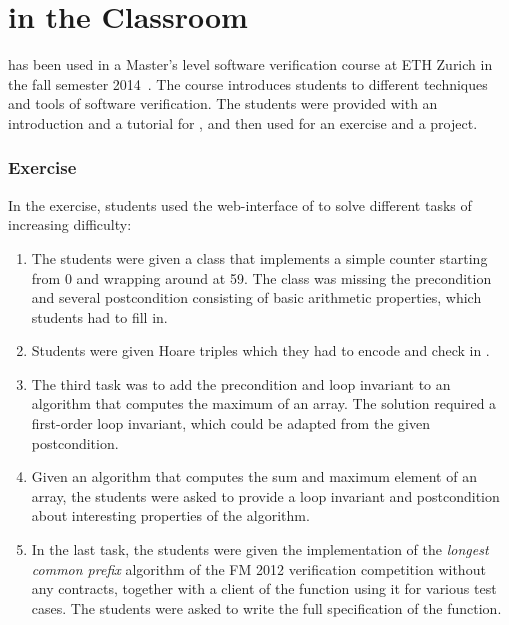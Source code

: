 \section{\AutoProof in the Classroom}
\label{sec:eval-teaching}

\AutoProof has been used in a Master's level software verification course at ETH Zurich in the fall semester 2014~\cite{SVCOURSE14}.
The course introduces students to different techniques and tools of software verification.
The students were provided with an introduction and a tutorial for \AutoProof, and then used \AutoProof for an exercise and a project.

\subsubsection{Exercise}

In the exercise, students used the web-interface of \AutoProof to solve different tasks of increasing difficulty:

\begin{enumerate}

\item The students were given a class that implements a simple counter starting from 0 and wrapping around at 59. The class was missing the precondition and several postcondition consisting of basic arithmetic properties, which students had to fill in.

\item Students were given Hoare triples which they had to encode and check in \AutoProof.

\item The third task was to add the precondition and loop invariant to an algorithm that computes the maximum of an array. The solution required a first-order loop invariant, which could be adapted from the given postcondition.

\item Given an algorithm that computes the sum and maximum element of an array, the students were asked to provide a loop invariant and postcondition about interesting properties of the algorithm.

\item In the last task, the students were given the implementation of the \emph{longest common prefix} algorithm of the FM 2012 verification competition without any contracts, together with a client of the  function using it for various test cases. The students were asked to write the full specification of the  function.

\end{enumerate}


